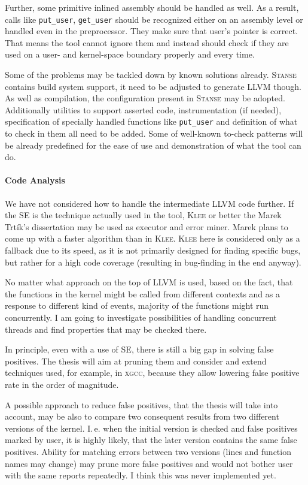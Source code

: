 \documentclass[11pt,a4paper]{article}
\newcommand{\stan}{\textsc{Stanse}\xspace}
\begin{document}
Further, some primitive inlined assembly should be handled as well. As a
result, calls like \texttt{put\_user}, \texttt{get\_user} should be recognized
either on an assembly level or handled even in the preprocessor. They make
sure that user's pointer is correct. That means the tool cannot ignore them
and instead should check if they are used on a user- and kernel-space boundary
properly and every time.

Some of the problems may be tackled down by known solutions already. \stan
contains build system support, it need to be adjusted to generate LLVM though.
As well as compilation, the configuration present in \stan may be adopted.
Additionally utilities to support asserted code, instrumentation (if needed),
specification of specially handled functions like \texttt{put\_user} and
definition of what to check in them all need to be added. Some of well-known
to-check patterns will be already predefined for the ease of use and
demonstration of what the tool can do.

\paragraph{Code Analysis} We have not considered how to handle the
intermediate LLVM code further. If the SE is the technique actually used in
the tool, \textsc{Klee} or better the Marek Trtík's dissertation may be used
as executor and error miner. Marek plans to come up with a faster algorithm
than in \textsc{Klee}.  \textsc{Klee} here is considered only as a fallback
due to its speed, as it is not primarily designed for finding specific bugs,
but rather for a high code coverage (resulting in bug-finding in the end
anyway).

No matter what approach on the top of LLVM is used, based on the fact, that
the functions in the kernel might be called from different contexts and as a
response to different kind of events, majority of the functions might run
concurrently. I am going to investigate possibilities of handling concurrent
threads and find properties that may be checked there.

In principle, even with a use of SE, there is still a big gap in solving false
positives. The thesis will aim at pruning them and consider and extend
techniques used, for example, in \textsc{xgcc}, because they allow lowering
false positive rate in the order of magnitude.

A possible approach to reduce false positives, that the thesis will take into
account, may be also to compare two consequent results from two different
versions of the kernel. I.\,e. when the initial version is checked and false
positives marked by user, it is highly likely, that the later version contains
the same false positives. Ability for matching errors between two versions
(lines and function names may change) may prune more false positives and would
not bother user with the same reports repeatedly. I think this was never
implemented yet.
\end{document}
